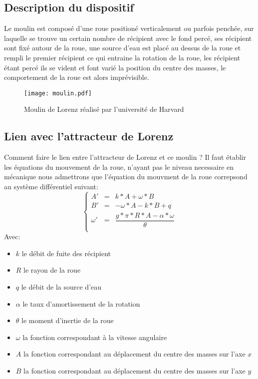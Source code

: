 \subsection{Description du dispositif}

Le moulin est composé d'une roue positioné verticalement ou parfois penchée, sur laquelle se trouve un certain nombre de récipient avec le fond percé, ses récipient sont fixé autour de la roue, une source d'eau est placé au dessus de la roue et rempli le premier récipient ce qui entraine la rotation de la roue, les récipient étant percé ils se vident et font varié la position du centre des masses, le comportement de la roue est alors imprévisible.

\begin{figure}
    \texttt{[image: moulin.pdf]}
    \caption{Moulin de Lorenz réalisé par l'université de Harvard} 
\end{figure}

\subsection{Lien avec l'attracteur de Lorenz}
Comment faire le lien entre l'attracteur de Lorenz et ce moulin ? Il faut établir les équations du mouvement de la roue, n'ayant pas le niveau necessaire en mécanique nous admettrons que l'équation du mouvment de la roue correpsond au système différentiel suivant:
\[
    \left\{
    \begin{array}{rcl}
        A'&=&k*A+\omega*B\\
        B'&=&-\omega*A-k*B+q\\
        \omega'&=&\dfrac{g*\pi*R*A-\alpha*\omega}{\theta }\\
    \end{array}
    \right.
\]
Avec: 
\begin{itemize}
    \item $k$ le débit de fuite des récipient
    \item $R$ le rayon de la roue
    \item $q$ le débit de la source d'eau
    \item $\alpha$ le taux d'amortissement de la rotation
    \item $\theta$ le moment d'inertie de la roue
    \item $\omega$ la fonction correspondant à la vitesse angulaire
    \item $A$ la fonction correspondant au déplacement du centre des masses sur l'axe $x$
    \item $B$ la fonction correspondant au déplacement du centre des masses sur l'axe $y$
\end{itemize}

